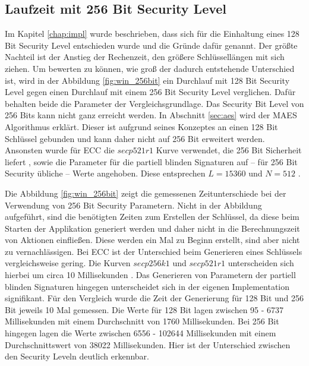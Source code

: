 \documentclass[
	fontsize=11pt,
	headings=small,
	parskip=half,           %
	bibliography=totoc,
	numbers=noenddot,       %
	open=any,               %
]{scrreprt}
\begin{document}
\subsection{Laufzeit mit 256 Bit Security Level}
\label{subsec:runTime256Bit}
Im Kapitel \ref{chap:impl} wurde beschrieben, dass sich für die Einhaltung eines 128 Bit Security Level entschieden wurde und die Gründe dafür genannt. Der größte Nachteil ist der Anstieg der Rechenzeit, den größere Schlüssellängen mit sich ziehen. Um bewerten zu können, wie groß der dadurch entstehende Unterschied ist, wird in der Abbildung \ref{fig:win_256bit} ein Durchlauf mit 128 Bit Security Level gegen einen Durchlauf mit einem 256 Bit Security Level verglichen. Dafür behalten beide die Parameter der Vergleichsgrundlage. Das Security Bit Level von 256 Bits kann nicht ganz erreicht werden. In Abschnitt \ref{sec:aes} wird der MAES Algorithmus erklärt. Dieser ist aufgrund seines Konzeptes an einen 128 Bit Schlüssel gebunden und kann daher nicht auf 256 Bit erweitert werden. Ansonsten wurde für ECC die $secp521r1$ Kurve verwendet, die 256 Bit Sicherheit liefert \cite{ecc-duka2020elliptic}, sowie die Parameter für die partiell blinden Signaturen auf -- für 256 Bit Security übliche -- Werte angehoben. Diese entsprechen $L=15360$ und $N=512$ \cite{elaine2016recommendation}.

Die Abbildung \ref{fig:win_256bit} zeigt die gemessenen Zeitunterschiede bei der Verwendung von 256 Bit Security Parametern. Nicht in der Abbildung aufgeführt, sind die benötigten Zeiten zum Erstellen der Schlüssel, da diese beim Starten der Applikation generiert werden und daher nicht in die Berechnungszeit von Aktionen einfließen. Diese werden ein Mal zu Beginn erstellt, sind aber nicht zu vernachlässigen. Bei ECC ist der Unterschied beim Generieren eines Schlüssels vergleichsweise gering. Die Kurven $secp256k1$ und $secp521r1$ unterscheiden sich hierbei um circa 10 Millisekunden \cite{ecc-duka2020elliptic}. Das Generieren von Parametern der partiell blinden Signaturen hingegen unterscheidet sich in der eigenen Implementation signifikant. Für den Vergleich wurde die Zeit der Generierung für 128 Bit und 256 Bit jeweils 10 Mal gemessen. Die Werte für 128 Bit lagen zwischen 95 - 6737 Millisekunden mit einem Durchschnitt von 1760 Millisekunden. Bei 256 Bit hingegen lagen die Werte zwischen 6556 - 102644 Millisekunden mit einem Durchschnittswert von 38022 Millisekunden. Hier ist der Unterschied zwischen den Security Leveln deutlich erkennbar.
\end{document}
